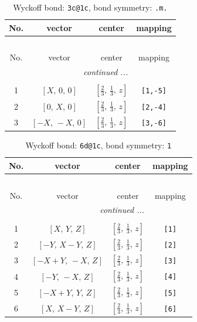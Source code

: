 \documentclass[fleqn,8pt]{jsarticle}
\begin{document}
\begin{longtable}{cccc}
\caption{Wyckoff bond: {\tt 3c@1c}, bond symmetry: {\tt .m.}}
 \\
 \hline \hline
No. & vector & center & mapping \\ \hline \endfirsthead

\multicolumn{3}{l}{\tablename\ \thetable{}} \\
 \hline \hline
No. & vector & center & mapping \\ \hline \endhead

 \hline \hline
\multicolumn{3}{r}{\footnotesize\it continued ...} \\ \endfoot

 \hline \hline
\multicolumn{3}{r}{} \\ \endlastfoot

1 & $\left[ X,\, 0,\, 0 \right]$ & $\left[ \frac{2}{3},\, \frac{1}{3},\, z \right]$ & {\tt [1,-5]} \\ \hline
2 & $\left[ 0,\, X,\, 0 \right]$ & $\left[ \frac{2}{3},\, \frac{1}{3},\, z \right]$ & {\tt [2,-4]} \\ \hline
3 & $\left[ - X,\, - X,\, 0 \right]$ & $\left[ \frac{2}{3},\, \frac{1}{3},\, z \right]$ & {\tt [3,-6]} \\
\end{longtable}
\renewcommand{\arraystretch}{1.2}
\begin{longtable}{cccc}
\caption{Wyckoff bond: {\tt 6d@1c}, bond symmetry: {\tt 1}}
 \\
 \hline \hline
No. & vector & center & mapping \\ \hline \endfirsthead

\multicolumn{3}{l}{\tablename\ \thetable{}} \\
 \hline \hline
No. & vector & center & mapping \\ \hline \endhead

 \hline \hline
\multicolumn{3}{r}{\footnotesize\it continued ...} \\ \endfoot

 \hline \hline
\multicolumn{3}{r}{} \\ \endlastfoot

1 & $\left[ X,\, Y,\, Z \right]$ & $\left[ \frac{2}{3},\, \frac{1}{3},\, z \right]$ & {\tt [1]} \\ \hline
2 & $\left[ - Y,\, X - Y,\, Z \right]$ & $\left[ \frac{2}{3},\, \frac{1}{3},\, z \right]$ & {\tt [2]} \\ \hline
3 & $\left[ - X + Y,\, - X,\, Z \right]$ & $\left[ \frac{2}{3},\, \frac{1}{3},\, z \right]$ & {\tt [3]} \\ \hline
4 & $\left[ - Y,\, - X,\, Z \right]$ & $\left[ \frac{2}{3},\, \frac{1}{3},\, z \right]$ & {\tt [4]} \\ \hline
5 & $\left[ - X + Y,\, Y,\, Z \right]$ & $\left[ \frac{2}{3},\, \frac{1}{3},\, z \right]$ & {\tt [5]} \\ \hline
6 & $\left[ X,\, X - Y,\, Z \right]$ & $\left[ \frac{2}{3},\, \frac{1}{3},\, z \right]$ & {\tt [6]} \\
\end{longtable}
\end{document}
